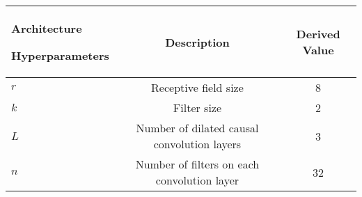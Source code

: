 \begin{tabular}{|p{3cm}|c|c|}
  \hline
  Architecture \par Hyperparameters & Description & Derived Value \\
  \hline
  
  $r$ & Receptive field size & 8\\ \hline
  $k$ & Filter size & 2\\ \hline
  $L$ & Number of dilated causal convolution layers & 3\\ \hline
  $n$ & Number of filters on each convolution layer & 32\\ \hline

\end{tabular}
